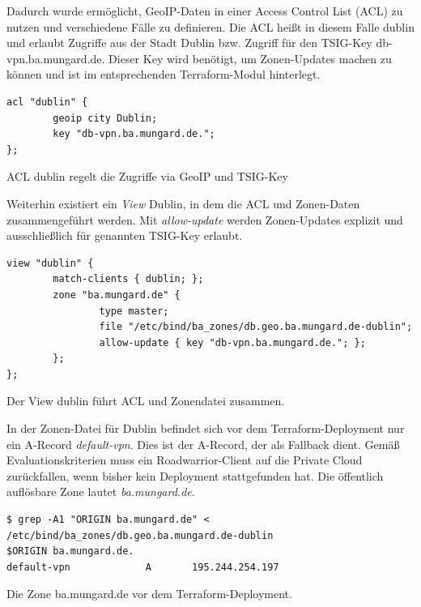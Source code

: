 Dadurch wurde ermöglicht, GeoIP-Daten in einer Access Control List (ACL) zu nutzen und verschiedene Fälle zu definieren. Die ACL heißt in diesem Falle \glqq dublin\grqq{} und erlaubt Zugriffe aus der Stadt Dublin bzw. Zugriff für den TSIG-Key \glqq db-vpn.ba.mungard.de\grqq{}. Dieser Key wird benötigt, um Zonen-Updates machen zu können und ist im entsprechenden Terraform-Modul hinterlegt.
\begin{listing}[h]
\begin{verbatim}
acl "dublin" {
        geoip city Dublin;
        key "db-vpn.ba.mungard.de.";
};
\end{verbatim}
\caption{ACL \glqq dublin\grqq{} regelt die Zugriffe via GeoIP und TSIG-Key}
\label{tsig-key-acl}
\end{listing}\FloatBarrier
Weiterhin existiert ein \textit{View} \glqq Dublin\grqq{}, in dem die ACL und Zonen-Daten zusammengeführt werden. Mit \textit{allow-update} werden Zonen-Updates explizit und ausschließlich für genannten TSIG-Key erlaubt.
\begin{listing}[h]
\begin{verbatim}
view "dublin" {
        match-clients { dublin; };
        zone "ba.mungard.de" {
                type master;
                file "/etc/bind/ba_zones/db.geo.ba.mungard.de-dublin";
                allow-update { key "db-vpn.ba.mungard.de."; };
        };
};
\end{verbatim}
\caption{Der View \glqq dublin\grqq{} führt ACL und Zonendatei zusammen.}
\label{view-dublin-bind}
\end{listing}\FloatBarrier
In der Zonen-Datei für Dublin befindet sich vor dem Terraform-\gls{Deployment} nur ein A-Record \textit{default-vpn}. Dies ist der A-Record, der als Fallback dient. Gemäß Evaluationskriterien muss ein Roadwarrior-Client auf die Private Cloud zurückfallen, wenn bisher kein \gls{Deployment} stattgefunden hat. Die öffentlich auflösbare Zone lautet \textit{ba.mungard.de}.
\begin{listing}[h]
\begin{verbatim}
$ grep -A1 "ORIGIN ba.mungard.de" < /etc/bind/ba_zones/db.geo.ba.mungard.de-dublin
$ORIGIN ba.mungard.de.
default-vpn             A       195.244.254.197
\end{verbatim}
\caption{Die Zone ba.mungard.de vor dem Terraform-\gls{Deployment}.}
\label{zone-dublin-before-deployment}
\end{listing}\FloatBarrier
